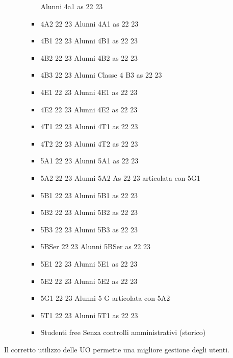 \begin{itemize}
\begin{itemize}
\begin{itemize}
	Alunni 4a1 as 22 23	
	\item 4A2 22 23
	Alunni 4A1 as 22 23	
	\item 4B1 22 23
	Alunni 4B1 as 22 23	
	\item 4B2 22 23
	Alunni 4B2 as 22 23	
	\item 4B3 22 23
	Alunni Classe 4 B3 as 22 23	
	\item 4E1 22 23
	Alunni 4E1 as 22 23	
	\item 4E2 22 23
	Alunni 4E2 as 22 23	
	\item 4T1 22 23
	Alunni 4T1 as 22 23	
	\item 4T2 22 23
	Alunni 4T2 as 22 23	
	\item 5A1 22 23
	Alunni 5A1 as 22 23	
	\item 5A2 22 23
	Alunni 5A2 As 22 23 articolata con 5G1	
	\item 5B1 22 23
	Alunni 5B1 as 22 23	
	\item 5B2 22 23
	Alunni 5B2 as 22 23	
	\item 5B3 22 23
	Alunni 5B3 as 22 23	
	\item 5BSer 22 23
	Alunni 5BSer as 22 23	
	\item 5E1 22 23
	Alunni 5E1 as 22 23	
	\item 5E2 22 23
	Alunni 5E2 as 22 23	
	\item 5G1 22 23
	Alunni 5 G articolata con 5A2	
	\item 5T1 22 23
	Alunni 5T1 as 22 23	
	\item Studenti free
	Senza controlli amministrativi (storico)
\end{itemize}
	\end{itemize}
\end{itemize} 

Il corretto utilizzo delle UO permette  una migliore gestione degli utenti.
